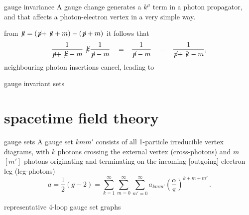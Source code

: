 \begin{frame}{gauge invariance}
A gauge change generates a $k^\mu$ term in a photon propagator,
 and that affects a photon-electron vertex in a very simple way.

\medskip
from \(
\not\!{k} = (\not\!{p}+\not\!{k}+m) - (\not\!{p}+m)
\)
it follows that
\begin{align}
  \begin{tabular}{ccccc}
$\!{\begin{aligned}\frac{1}{\not\!{p}+\not\!{k}-m}\not\!{k}\frac{1}{\not\!{p}-m}\end{aligned}}$ &
$=$ &    $\!{\begin{aligned}\frac{1}{\not\!{p}-m}\end{aligned}}$ &
$-$ &    $\!{\begin{aligned}\frac{1}{\not\!{p}+\not\!{k}-m},\end{aligned}}$
  \end{tabular}
  \nnu %
\end{align}
neighbouring photon insertions cancel, leading to

\vfill\hfill \textcolor{blue!90!black}{gauge invariant sets}
\end{frame}

\section[spacetime field theory]
 {spacetime field theory}
\label{spacetimeFT}

\begin{frame}{gauge sets}
A gauge set $kmm'$ consists of all 1-particle irreducible vertex
diagrams, with $k$ photons crossing the external
vertex (cross-photons) and $m$ $[m']$ photons originating and terminating
on the incoming [outgoing] electron leg (leg-photons)
\[ %
a=\frac{1}{2}(g-2)
       =  \sum_{k=1}^\infty\sum_{m=0}^\infty\sum_{m'=0}^\infty
          a_{kmm'}\left(\frac{\alpha}{\pi}\right)^{k+m+m'}
\,.
\] %
\end{frame}


\begin{frame}{representative 4-loop gauge set graphs}

\end{frame}

